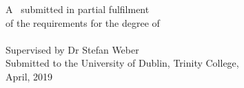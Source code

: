 \begin{titlepage}
A \typeofthesis\ submitted in partial fulfilment \\of the requirements for the degree of\\
\degree\\[1cm]


Supervised by Dr Stefan Weber\\[1cm]


Submitted to the University of Dublin, Trinity College,\\
April, 2019

\vfill %

\end{titlepage}
